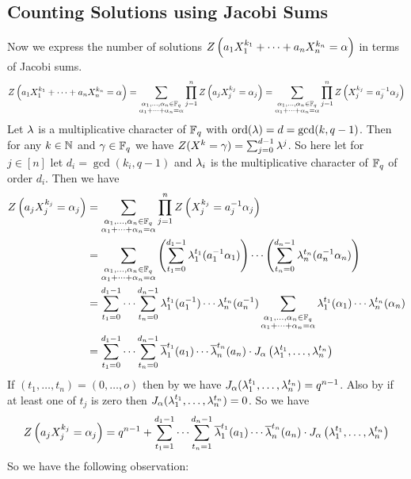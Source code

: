 \subsection{Counting Solutions using Jacobi Sums}
%
Now we express the number of solutions $Z\left(a_1X_1^{k_1}+\cdots+a_nX_n^{k_n}=\alpha\right)$ in terms of Jacobi sums. 
$$Z\left(a_1X_1^{k_1}+\cdots+a_nX_n^{k_n}=\alpha\right) = \sum_{\substack{\alpha_1,\dots,\alpha_n\in\mathbb{F}_q\\ \alpha_1+\cdots +\alpha_n=\alpha}}\prod_{j=1}^n Z\left( a_jX_j^{k_j}=\alpha_j\right)=\sum_{\substack{\alpha_1,\dots,\alpha_n\in\mathbb{F}_q\\ \alpha_1+\cdots +\alpha_n=\alpha}}\prod_{j=1}^n Z\left(X_j^{k_j}=a_j^{-1}\alpha_j\right)$$ Let $\lambda$ is a multiplicative character of $\mathbb{F}_q$ with $\operatorname{ord}(\lambda)=d=\gcd(k,q-1)$. Then for any $k\in\mathbb{N}$ and $\gamma\in\mathbb{F}_q$ we have $Z(X^k=\gamma)=\sum_{j=0}^{d-1}\lambda^j$. So here let for $j\in[n]$ let $d_i=\gcd(k_i,q-1)$ and $\lambda_i$ is the multiplicative character of $\mathbb{F}_q$ of order $d_i$. Then we have 
\begin{align*}
  Z\left( a_jX_j^{k_j}=\alpha_j\right) & = \sum_{\substack{\alpha_1,\dots,\alpha_n\in\mathbb{F}_q\\ \alpha_1+\cdots +\alpha_n=\alpha}}\prod_{j=1}^n Z\left(X_j^{k_j}=a_j^{-1}\alpha_j\right)\\ 
  & = \sum_{\substack{\alpha_1,\dots,\alpha_n\in\mathbb{F}_q\\ \alpha_1+\cdots +\alpha_n=\alpha}} \left(\sum_{t_1=0}^{d_1-1}\lambda_1^{t_1}(a_1^{-1}\alpha_1)\right)\cdots\left(\sum_{t_n=0}^{d_n-1}\lambda_n^{t_n}(a_n^{-1}\alpha_n)\right)\\
  & = \sum_{t_1=0}^{d_1-1}\cdots \sum_{t_n=0}^{d_n-1}\lambda_1^{t_1}(a_1^{-1})\cdots\lambda_n^{t_n}(a_n^{-1}) \sum_{\substack{\alpha_1,\dots,\alpha_n\in\mathbb{F}_q\\ \alpha_1+\cdots +\alpha_n=\alpha}}\lambda_1^{t_1}(\alpha_1)\cdots\lambda_n^{t_n}(\alpha_n)\\
  & = \sum_{t_1=0}^{d_1-1}\cdots \sum_{t_n=0}^{d_n-1}\overline{\lambda}_1^{t_1}(a_1)\cdots\overline{\lambda}_n^{t_n}(a_n) \cdot J_{\alpha}\left(\lambda_1^{t_1},\dots, \lambda_n^{t_n}\right)
\end{align*}
If $(t_1,\dots, t_n)=(0,\dots, o)$ then by \JacobiCompletethm[(i)] we have $J_{\alpha}(\lambda_1^{t_1},\dots,\lambda_n^{t_n})=q^{n-1}$. Also by \JacobiCompletethm[(ii)] if at least one of $t_j$ is zero then $J_{\alpha}(\lambda_1^{t_1},\dots,\lambda_n^{t_n})=0$. So we have $$Z\left( a_jX_j^{k_j}=\alpha_j\right)=q^{n-1}+\sum_{t_1=1}^{d_1-1}\cdots \sum_{t_n=1}^{d_n-1}\overline{\lambda}_1^{t_1}(a_1)\cdots\overline{\lambda}_n^{t_n}(a_n) \cdot J_{\alpha}\left(\lambda_1^{t_1},\dots, \lambda_n^{t_n}\right)$$So we have the following observation:
